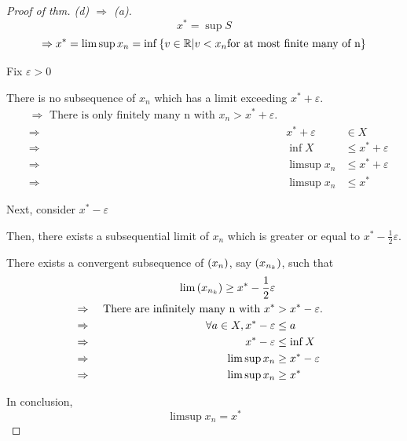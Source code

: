 \documentclass[a4paper,12pt]{article}
\begin{document}
\begin{theorem}
    \begin{proof}[Proof of thm. (d) \(\Rightarrow\) (a)]
        \[x^*=\sup{S}\]
        \[\Rightarrow x^*=\limsup{x_n}=\inf{\{v\in\mathbb{R}| v<x_n \text{for at most finite many of n}\}}\]

        Fix \(\varepsilon>0\)

        There is no subsequence of \(x_n\) which has a limit exceeding \(x^*+\varepsilon\).
        \begin{align*}
            &\Rightarrow \text{ There is only finitely many n with }x_n>x^*+\varepsilon.\\
            &\Rightarrow &x^*+\varepsilon&\in X\\
            &\Rightarrow &\inf{X} &\le x^*+\varepsilon\\
            &\Rightarrow &\limsup{x_n}&\le x^*+\varepsilon\\
            &\Rightarrow &\limsup{x_n}&\le x^*
        \end{align*}

        Next, consider \(x^*-\varepsilon\)

        Then, there exists a subsequential limit of \(x_n\) which is greater or equal to \(x^*-\frac{1}{2}\varepsilon\).
        
        There exists a convergent subsequence of \((x_{n})\), say \((x_{n_k})\), such that 
        \begin{align*}
            &&\lim{(x_{n_k})}\ge x^*-\frac{1}{2}\varepsilon\\
            &\Rightarrow&\text{ There are infinitely many n with } x^*&>x^*-\varepsilon.&\\
            &\Rightarrow&\forall a\in X, x^*-\varepsilon &\le a\\
            &\Rightarrow&x^*-\varepsilon &\le \inf{X}\\
            &\Rightarrow&\limsup{x_n}&\ge x^*-\varepsilon\\
            &\Rightarrow&\limsup{x_n}&\ge x^*
        \end{align*}
        
        In conclusion, \[\limsup{x_n}=x^*\]

    \end{proof}
\end{theorem}
\newpage
\end{document}
